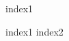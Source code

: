 \documentclass{beamer}
\begin{document}
\begin{frame}
index1
\end{frame}

\begin{frame}
index1
index2
\end{frame}

\begin{frame}
\printindex
\end{frame}
\end{document}
